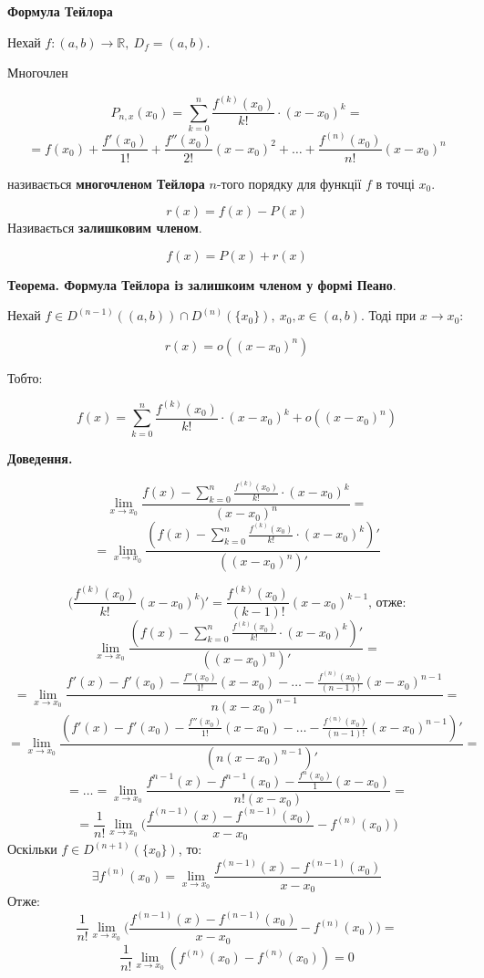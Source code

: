 \documentclass[12pt]{report}
\begin{document}
\begin{center}
\textbf{Формула Тейлора}
\end{center}

Нехай $f : (a,b) \to \mathbb{R},\ D_f = (a,b)$.

Многочлен

$$P_{n,x}(x_0) = \sum_{k = 0}^{n}\frac{f^{(k)}(x_0)}{k!} \cdot (x-x_0)^k = $$
$$= f(x_0) + \frac{f'(x_0)}{1!} + \frac{f''(x_0)}{2!}(x-x_0)^2 + \ldots + \frac{f^{(n)}(x_0)}{n!} (x-x_0)^n$$

називається \textbf{многочленом Тейлора} $n$-того порядку для функції $f$ в точці $x_0$.

$$r(x) = f(x) - P(x)$$
Називається \textbf{залишковим членом}.

$$f(x) = P(x) + r(x)$$

\textbf{Теорема. Формула Тейлора із залишкоим членом у формі Пеано}.

Нехай $f\in D^{(n-1)}((a,b)) \cap D^{(n)}(\{ x_0\}),\ x_0, x \in (a,b)$. Тоді при $x \to x_0$:

$$r(x) = o((x - x_0)^n)$$

Тобто:

$$f(x) = \sum_{k = 0}^{n}\frac{f^{(k)}(x_0)}{k!} \cdot (x-x_0)^k + o((x - x_0)^n)$$

\textbf{Доведення.}

$$\lim_{x\to x_0}\frac{f(x) - \sum_{k = 0}^{n}\frac{f^{(k)}(x_0)}{k!} \cdot (x-x_0)^k}{(x - x_0)^n} = $$
$$ = \lim_{x\to x_0}\frac{(f(x) - \sum_{k = 0}^{n}\frac{f^{(k)}(x_0)}{k!} \cdot (x-x_0)^k)'}{((x - x_0)^n)'} $$

$$\Big(\frac{f^{(k)}(x_0)}{k!} (x - x_0)^k\Big)' = \frac{f^{(k)}(x_0)}{(k-1)!} (x - x_0)^{k-1}\textrm{, отже:}$$
$$\lim_{x\to x_0}\frac{(f(x) - \sum_{k = 0}^{n}\frac{f^{(k)}(x_0)}{k!} \cdot (x-x_0)^k)'}{((x - x_0)^n)'} = $$
$$= \lim_{x \to x_0}\frac{f'(x) - f'(x_0) - \frac{f''(x_0)}{1!}(x - x_0) - \ldots - \frac{f^{(n)}(x_0)}{(n-1)!} (x - x_0)^{n-1}}{n(x - x_0)^{n-1}} = $$
$$= \lim_{x \to x_0}\frac{(f'(x) - f'(x_0) - \frac{f''(x_0)}{1!}(x - x_0) - \ldots - \frac{f^{(n)}(x_0)}{(n-1)!} (x - x_0)^{n-1})'}{(n(x - x_0)^{n-1})'} = $$
$$= \ldots = \lim_{x \to x_0}\frac{f^{n-1}(x) - f^{n-1}(x_0) - \frac{f^{n}(x_0)}{1} (x - x_0)}{n! (x - x_0)} = $$
$$= \frac{1}{n!} \lim_{x\to x_0}\Big( \frac{f^{(n-1)}(x) - f^{(n-1)}(x_0)}{x - x_0} - f^{(n)}(x_0)\Big)$$
Оскільки $f \in D^{(n+1)}(\{ x_0\})$, то:
$$\exists f^{(n)}(x_0) = \lim_{x\to x_0} \frac{f^{(n-1)}(x) - f^{(n-1)}(x_0)}{x - x_0}$$
Отже: 
$$\frac{1}{n!} \lim_{x\to x_0}\Big( \frac{f^{(n-1)}(x) - f^{(n-1)}(x_0)}{x - x_0} - f^{(n)}(x_0)\Big) = $$
$$\frac{1}{n!} \lim_{x \to x_0}(f^{(n)}(x_0) - f^{(n)}(x_0)) = 0$$
\end{document}
